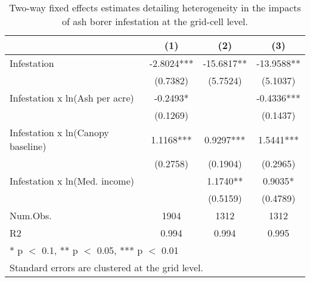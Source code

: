 \begin{table}[!h]

\caption{Two-way fixed effects estimates detailing heterogeneity in the impacts of ash borer infestation at the grid-cell level.}
\centering
\begin{tabular}[t]{lccc}
\toprule
  & (1) & (2) & (3)\\
\midrule
Infestation & -2.8024*** & -15.6817** & -13.9588**\\
 & (0.7382) & (5.7524) & (5.1037)\\
Infestation x ln(Ash per acre) & -0.2493* &  & -0.4336***\\
 & (0.1269) &  & (0.1437)\\
Infestation x ln(Canopy baseline) & 1.1168*** & 0.9297*** & 1.5441***\\
 & (0.2758) & (0.1904) & (0.2965)\\
Infestation x ln(Med. income) &  & 1.1740** & 0.9035*\\
 &  & (0.5159) & (0.4789)\\
\midrule
Num.Obs. & 1904 & 1312 & 1312\\
R2 & 0.994 & 0.994 & 0.995\\
\bottomrule
\multicolumn{4}{l}{\rule{0pt}{1em}* p $<$ 0.1, ** p $<$ 0.05, *** p $<$ 0.01}\\
\multicolumn{4}{l}{\rule{0pt}{1em}Standard errors are clustered at the grid level.}\\
\end{tabular}
\end{table}
